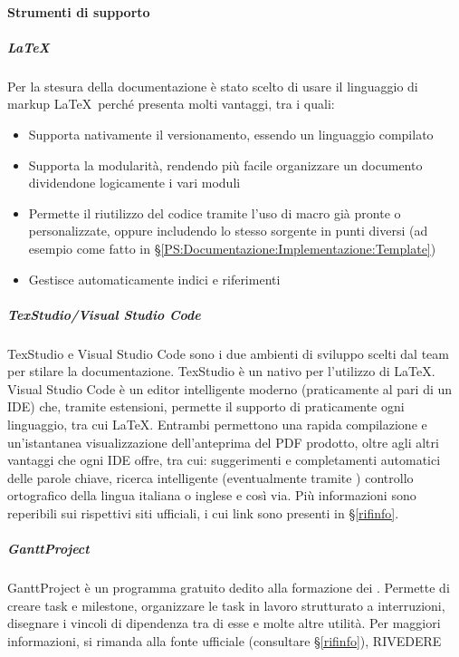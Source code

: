 			\paragraph{Strumenti di supporto}

			\subparagraph{\LaTeX} \label{LaTeX}
			Per la stesura della documentazione è stato scelto di usare il linguaggio di markup \LaTeX \ perché presenta molti vantaggi, tra i quali:
			\begin{itemize}
				\item Supporta nativamente il versionamento, essendo un linguaggio compilato
				\item Supporta la modularità, rendendo più facile organizzare un documento dividendone logicamente i vari moduli
				\item Permette il riutilizzo del codice tramite l'uso di macro già pronte o personalizzate, oppure includendo lo stesso sorgente in punti diversi
					(ad esempio come fatto in \S\ref{PS:Documentazione:Implementazione:Template})
				\item Gestisce automaticamente indici e riferimenti
			\end{itemize}

			\subparagraph{TexStudio/Visual Studio Code}
			TexStudio e Visual Studio Code sono i due ambienti di sviluppo scelti dal team per stilare la documentazione.
			TexStudio è un  nativo per l'utilizzo di \LaTeX. Visual Studio Code è un editor intelligente moderno (praticamente al pari di un IDE) che, tramite
			estensioni, permette il supporto di praticamente ogni linguaggio, tra cui \LaTeX.
			Entrambi permettono una rapida compilazione e un'istantanea visualizzazione dell'anteprima del PDF prodotto, oltre agli altri vantaggi che ogni IDE offre,
			tra cui: suggerimenti e completamenti automatici delle parole chiave, ricerca intelligente (eventualmente tramite ) controllo ortografico della
			lingua italiana o inglese e così via. Più informazioni sono reperibili sui rispettivi siti ufficiali, i cui link sono presenti in \S\ref{rifinfo}.

			\subparagraph{GanttProject}
			GanttProject è un programma gratuito dedito alla formazione dei . Permette di creare task e milestone, organizzare le task
			in lavoro strutturato a interruzioni, disegnare i vincoli di dipendenza tra di esse e molte altre utilità.
			Per maggiori informazioni, si rimanda alla fonte ufficiale (consultare \S\ref{rifinfo}), RIVEDERE

